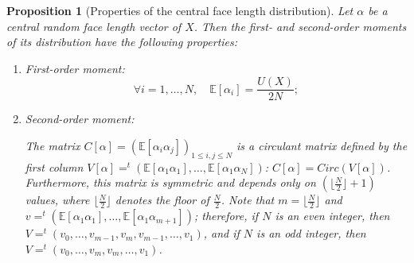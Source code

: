 \documentclass[numbers,compress,v1.0.1]{vmsta}
\newtheorem{proposition}{Proposition}
\theoremstyle{definition}
\begin{document}
\begin{proposition}[Properties of the central face length distribution]
Let $\alpha$ be a central random face length vector of $X$. Then the
first- and second-order moments of its distribution have the following
properties:
%
\begin{enumerate}
%
\item First-order moment:
%
\begin{equation}
\forall i=1,\dots,N,\quad \mathbb{E}[\alpha_i]=\frac{U(X)}{2N};
\end{equation}
%
\item Second-order moment:

The matrix $C[\alpha]=(\mathbb{E}[\alpha_i\alpha_j])_{1\leq i,j\leq N}$
is a circulant matrix defined by the first column $V[\alpha]=^t(\mathbb
{E}[\alpha_1\alpha_1],\dots,\mathbb{E}[\alpha_1\alpha_N])$: $C[\alpha]
=Circ(V[\alpha])$. Furthermore, this matrix is symmetric and depends
only on $(\lfloor\frac{N}{2}\rfloor+1)$ values, where $\lfloor\frac
{N}{2}\rfloor$ denotes the floor of $\frac{N}{2}$. Note that $
m=\lfloor\frac{N}{2}\rfloor$ and $v=^t(\mathbb{E}[\alpha_1\alpha
_1],\dots,\mathbb{E}[\alpha_1\alpha_{m+1 }])$; therefore, if $N$ is an
even integer, then $V=^t(v_0,\dots,v_{m-1},v_{m},v_{m-1},\dots,v_1)$,
and if $N$ is an odd integer, then $V=^t(v_0,\dots,v_m,v_{m},\dots,v_1)$.
\end{enumerate}
%
\label{prop:propCentralDistr}
\end{proposition}
%
\end{document}
